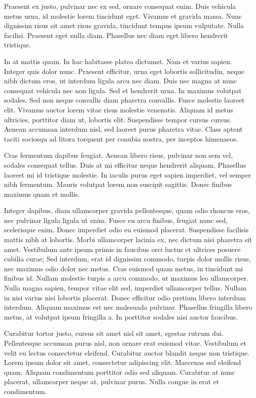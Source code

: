Praesent ex justo, pulvinar nec ex sed, ornare consequat enim. Duis vehicula metus urna, id molestie lorem tincidunt eget. Vivamus et gravida massa. Nunc dignissim risus sit amet risus gravida, tincidunt tempus ipsum vulputate. Nulla facilisi. Praesent eget nulla diam. Phasellus nec diam eget libero hendrerit tristique.

In at mattis quam. In hac habitasse platea dictumst. Nam et varius sapien. Integer quis dolor nunc. Praesent efficitur, urna eget lobortis sollicitudin, neque nibh dictum eros, ut interdum ligula arcu nec diam. Duis nec magna at nunc consequat vehicula nec non ligula. Sed et hendrerit urna. In maximus volutpat sodales. Sed non neque convallis diam pharetra convallis. Fusce molestie laoreet elit. Vivamus auctor lorem vitae risus molestie venenatis. Aliquam id metus ultricies, porttitor diam ut, lobortis elit. Suspendisse tempor cursus cursus. Aenean accumsan interdum nisl, sed laoreet purus pharetra vitae. Class aptent taciti sociosqu ad litora torquent per conubia nostra, per inceptos himenaeos.

Cras fermentum dapibus feugiat. Aenean libero risus, pulvinar non sem vel, sodales consequat tellus. Duis at mi efficitur neque hendrerit aliquam. Phasellus laoreet mi id tristique molestie. In iaculis purus eget sapien imperdiet, vel semper nibh fermentum. Mauris volutpat lorem non suscipit sagittis. Donec finibus maximus quam et mollis.

Integer dapibus, diam ullamcorper gravida pellentesque, quam odio rhoncus eros, nec pulvinar ligula ligula ut enim. Fusce eu arcu finibus, feugiat nunc sed, scelerisque enim. Donec imperdiet odio eu euismod placerat. Suspendisse facilisis mattis nibh at lobortis. Morbi ullamcorper lacinia ex, nec dictum nisi pharetra sit amet. Vestibulum ante ipsum primis in faucibus orci luctus et ultrices posuere cubilia curae; Sed interdum, erat id dignissim commodo, turpis dolor mollis risus, nec maximus odio dolor nec metus. Cras euismod quam metus, in tincidunt mi finibus id. Nullam molestie turpis a arcu commodo, ut maximus leo ullamcorper. Nulla magna sapien, tempor vitae elit sed, imperdiet ullamcorper tellus. Nullam in nisi varius nisi lobortis placerat. Donec efficitur odio pretium libero interdum interdum. Aliquam maximus est nec malesuada pulvinar. Phasellus fringilla libero metus, at volutpat ipsum fringilla a. In porttitor sodales nisi auctor faucibus.

Curabitur tortor justo, cursus sit amet nisl sit amet, egestas rutrum dui. Pellentesque accumsan purus nisl, non ornare erat euismod vitae. Vestibulum et velit eu lectus consectetur eleifend. Curabitur auctor blandit neque non tristique. Lorem ipsum dolor sit amet, consectetur adipiscing elit. Maecenas sed eleifend quam. Aliquam condimentum porttitor odio sed aliquam. Curabitur at nunc placerat, ullamcorper neque at, pulvinar purus. Nulla congue in erat et condimentum.

